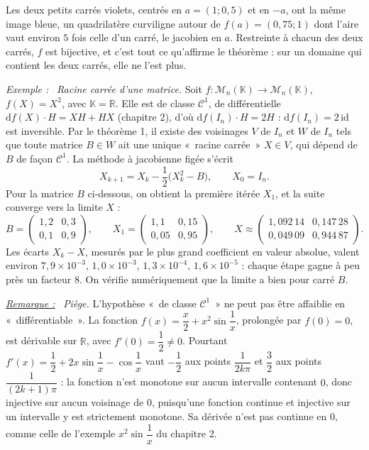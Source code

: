 \documentclass[a4paper,twoside]{report}
\newenvironment{exemple}%
 {\par\needspace{6\baselineskip}\vspace{1mm}\begin{list}{}{\leftmargin=1cm \rightmargin=0.5cm}\item[]%
  \textit{Exemple :}~}%
 {\end{list}\vspace{1mm}}
\newenvironment{remarque}%
 {\par\needspace{6\baselineskip}\vspace{1mm}\begin{list}{}{\leftmargin=1cm \rightmargin=0.5cm}\item[]%
  \textit{\underline{Remarque :}}~}%
 {\end{list}\vspace{1mm}}
\newcommand{\R}{\mathbb{R}}
\newcommand{\K}{\mathbb{K}}                       %
\newcommand{\id}{\mathrm{id}}                     %
\newcommand{\dd}{\mathrm{d}}                      %
\newcommand{\Mn}[1]{\mathcal{M}_{#1}(\K)}          %
\newcommand{\Cc}{\mathcal{C}}                     %
\begin{document}
\noindent Les deux petits carrés violets, centrés en $a = (1 ; 0{,}5)$ et en $-a$, ont la même image bleue, un quadrilatère curviligne autour de $f(a) = (0{,}75 ; 1)$ dont l'aire vaut environ $5$ fois celle d'un carré, le jacobien en $a$. Restreinte à chacun des deux carrés, $f$ est bijective, et c'est tout ce qu'affirme le théorème : sur un domaine qui contient les deux carrés, elle ne l'est plus.

\begin{exemple}
\emph{Racine carrée d'une matrice.} Soit $f : \Mn{n} \to \Mn{n}$, $f(X) = X^{2}$, avec $\K = \R$. Elle est de classe $\Cc^{1}$, de différentielle $\dd f(X)\cdot H = XH + HX$ (chapitre 2), d'où $\dd f(I_{n})\cdot H = 2H$ : $\dd f(I_{n}) = 2\,\id$ est inversible. Par le théorème 1, il existe des voisinages $V$ de $I_{n}$ et $W$ de $I_{n}$ tels que toute matrice $B \in W$ ait une unique «~racine carrée~» $X \in V$, qui dépend de $B$ de façon $\Cc^{1}$. La méthode à jacobienne figée s'écrit
\[ X_{k + 1} = X_{k} - \frac{1}{2}\big(X_{k}^{2} - B\big), \qquad X_{0} = I_{n}. \]
Pour la matrice $B$ ci-dessous, on obtient la première itérée $X_{1}$, et la suite converge vers la limite $X$ :
\[ B = \begin{pmatrix} 1{,}2 & 0{,}3 \\ 0{,}1 & 0{,}9 \end{pmatrix}, \qquad X_{1} = \begin{pmatrix} 1{,}1 & 0{,}15 \\ 0{,}05 & 0{,}95 \end{pmatrix}, \qquad X \approx \begin{pmatrix} 1{,}092\,14 & 0{,}147\,28 \\ 0{,}049\,09 & 0{,}944\,87 \end{pmatrix}. \]
Les écarts $X_{k} - X$, mesurés par le plus grand coefficient en valeur absolue, valent environ $7{,}9 \times 10^{-3}$, $1{,}0 \times 10^{-3}$, $1{,}3 \times 10^{-4}$, $1{,}6 \times 10^{-5}$ : chaque étape gagne à peu près un facteur $8$. On vérifie numériquement que la limite a bien pour carré $B$.
\end{exemple}

\begin{remarque}
\emph{Piège.} L'hypothèse «~de classe $\Cc^{1}$~» ne peut pas être affaiblie en «~différentiable~». La fonction $f(x) = \dfrac{x}{2} + x^{2}\sin\dfrac{1}{x}$, prolongée par $f(0) = 0$, est dérivable sur $\R$, avec $f'(0) = \dfrac{1}{2} \neq 0$. Pourtant $f'(x) = \dfrac{1}{2} + 2x\sin\dfrac{1}{x} - \cos\dfrac{1}{x}$ vaut $-\dfrac{1}{2}$ aux points $\dfrac{1}{2k\pi}$ et $\dfrac{3}{2}$ aux points $\dfrac{1}{(2k + 1)\pi}$ : la fonction n'est monotone sur aucun intervalle contenant $0$, donc injective sur aucun voisinage de $0$, puisqu'une fonction continue et injective sur un intervalle y est strictement monotone. Sa dérivée n'est pas continue en $0$, comme celle de l'exemple $x^{2}\sin\dfrac{1}{x}$ du chapitre 2.
\end{remarque}
\end{document}
